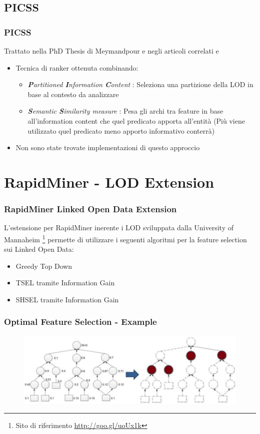 \documentclass{beamer}
\begin{document}
\subsection{PICSS}
\begin{frame}
	\frametitle{PICSS}
	Trattato nella PhD Thesis di Meymandpour e negli articoli correlati \cite{Meymandpour_ESWC_2014} e \cite{MeymandpourD13}
	\begin{itemize}
		\item Tecnica di ranker ottenuta combinando:
		\begin{itemize}
			\item \emph{\textbf{P}artitioned \textbf{I}nformation \textbf{C}ontent} : Seleziona una partizione della LOD in base al contesto da analizzare
			\item \emph{\textbf{S}emantic \textbf{S}imilarity measure} : Pesa gli archi tra feature in base all'information content che quel predicato apporta all'entità (Più viene utilizzato quel predicato meno apporto informativo conterrà)
		\end{itemize}
		\item Non sono state trovate implementazioni di questo approccio
	\end{itemize}
\end{frame}

\section{RapidMiner - LOD Extension}
\begin{frame}
	\frametitle{RapidMiner Linked Open Data Extension}
	L'estensione per RapidMiner inerente i LOD sviluppata dalla University of Mannaheim \footnote{Sito di riferimento \url{http://goo.gl/uoUx1k}} permette di utilizzare i seguenti algoritmi per la feature selection sui Linked Open Data:
	\begin{itemize}
		\item Greedy Top Down\\
		\item TSEL tramite Information Gain\\
		\item SHSEL tramite Information Gain
	\end{itemize}
\end{frame}
\begin{frame}
	\frametitle{Optimal Feature Selection - Example}
	\begin{figure}[tbph]
		\centering
		\includegraphics[width=1\linewidth]{figure/Mannheim/Opt.png}
		\label{fig:Opt}
	\end{figure}
\end{frame}
\end{document}
